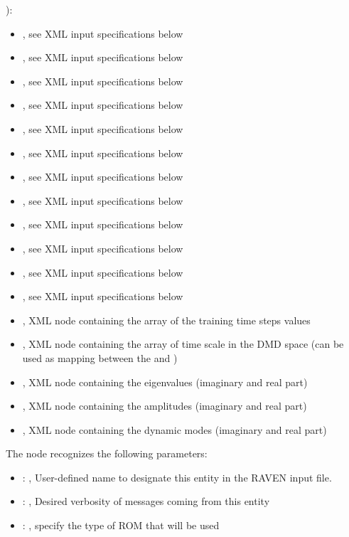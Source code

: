   ):     \begin{itemize}       \item {}, see XML input
  specifications below       \item {}, see XML input specifications below
  \item {}, see XML input specifications below       \item {},
  see XML input specifications below       \item {}, see XML input
  specifications below       \item {}, see XML input specifications below
  \item {}, see XML input specifications below       \item
  , see XML input specifications below       \item {},
  see XML input specifications below       \item {}, see XML input
  specifications below       \item {}, see XML input specifications below
  \item {}, see XML input specifications below       \item {}, XML
  node containing the array of the training time steps values       \item {},
  XML node containing the array of time scale in the DMD space (can be used as mapping       between
  the   and )       \item {}, XML node
  containing the eigenvalues (imaginary and real part)       \item {}, XML node
  containing the amplitudes (imaginary and real part)       \item {}, XML node
  containing the dynamic modes (imaginary and real part)     \end{itemize}

  The  node recognizes the following parameters:
    \begin{itemize}
      \item {}: , 
        User-defined name to designate this entity in the RAVEN input file.
      \item {}: , 
        Desired verbosity of messages coming from this entity
      \item {}: , 
        specify the type of ROM that will be used
  \end{itemize}

